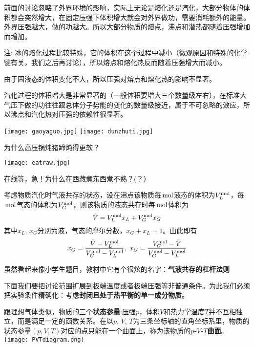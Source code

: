 \documentclass[CJK]{beamer}
\begin{document}
\begin{frame}
\bch
\bitem
\item{前面的讨论忽略了外界环境的影响，实际上无论是熔化还是汽化，大部分物体的体积都会突然增大，在固定压强下体积增大就会对外界做功，需要消耗额外的能量。外界压强越大，做的功越大。所以大部分物质的熔点，沸点和潜热都随着压强增加而增加。

\scriptsize 注: 冰的熔化过程比较特殊，它的体积在这个过程中减小（微观原因和特殊的化学键有关，我们之后再讨论），所以熔点和熔化热反而随着压强增大而减小。}
\item{由于固液态的体积变化不大，所以压强对熔点和熔化热的影响不显著。}
\item{汽化过程的体积增大是非常显著的（一般体积要增大三个数量级左右），在标准大气压下做的功往往跟总体分子势能的变化的数量级接近，属于不可忽略的效应，所以沸点和汽化热对压强的依赖性很显著。}
\eitem
\ech
\end{frame}

\begin{frame}
\bch
\texttt{[image: gaoyaguo.jpg]}
\texttt{[image: dunzhuti.jpg]}

为什么高压锅炖猪蹄炖得更软？
\ech
\end{frame}


\begin{frame}
\bch
\texttt{[image: eatraw.jpg]}

在线等，急！为什么在西藏煮东西煮不熟？(？）
\ech
\end{frame}

\begin{frame}
\bch
考虑物质汽化时气液共存的状态，设在沸点该物质每$\,\mathrm{mol}$液态的体积为$V_L^{\rm mol}$，每$\,\mathrm{mol}$气态的体积为$V_G^{\rm mol}$，则该物质的液态共存时每$\,\mathrm{mol}$体积为
$$\bar{V} = V_L^{\rm mol} x_L + V_G^{\rm mol} x_G$$ 
其中$x_L$, $x_G$分别为液，气态的摩尔分数，$x_G + x_L = 1$。由此即有
$$x_G = \frac{\bar{V} - V_L^{\rm mol}}{V_G^{\rm mol} - V_L^{\rm mol}},\ x_G = \frac{V_G^{\rm mol} - \bar{V}  }{V_G^{\rm mol} - V_L^{\rm mol}}$$

虽然看起来像小学生题目，教材中它有个很炫的名字：{\bf 气液共存的杠杆法则}
\ech
\end{frame}

\begin{frame}
\bch
\bitem
\item{下面我们要把讨论范围扩展到极端温度或者极端压强等非普通条件。为此我们必须把实验条件精确化：考虑{\bf 封闭且处于热平衡的单一成分物质}。}
\item{
跟理想气体类似，物质的三个{\bf 状态参量}:压强$p$，体积$V$和热力学温度$T$并不互相独立，而是满足一定的函数关系。在以$p$, $V$, $T$为三条坐标轴的直角坐标系里，物质的状态参量$(p, V, T)$对应的点只能在一个曲面上，称为该物质的{\bf $p$-$V$-$T$曲面}。
\emini
{}
\texttt{[image: PVTdiagram.png]}
\emini
}
\eitem
\ech
\end{frame}
\end{document}
